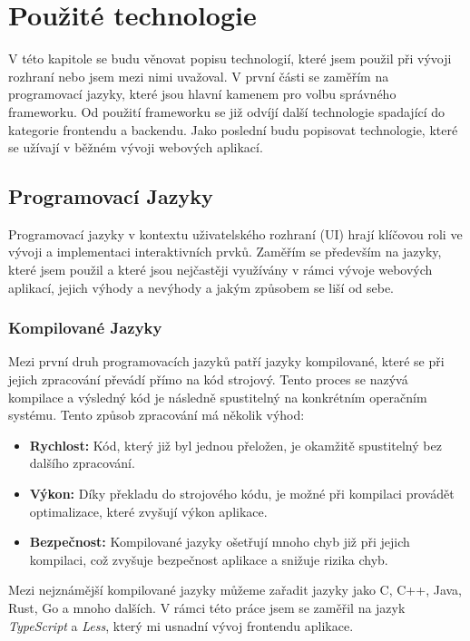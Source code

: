 \chapter{Použité technologie}
\label{ch:technology}
V této kapitole se budu věnovat popisu technologií, které jsem použil při vývoji rozhraní nebo jsem mezi nimi uvažoval. V první části se zaměřím na programovací jazyky, které jsou hlavní kamenem pro volbu správného frameworku. Od použití frameworku se již odvíjí další technologie spadající do kategorie frontendu a backendu. Jako poslední budu popisovat technologie, které se užívají v běžném vývoji webových aplikací.

\section{Programovací Jazyky}
\label{sec:languages}
Programovací jazyky v kontextu uživatelského rozhraní (UI) hrají klíčovou roli ve vývoji a implementaci interaktivních prvků. Zaměřím se především na jazyky, které jsem použil a které jsou nejčastěji využívány v rámci vývoje webových aplikací, jejich výhody a nevýhody a jakým způsobem se liší od sebe.

\subsection{Kompilované Jazyky}
\label{subsec:languages-compiled}
Mezi první druh programovacích jazyků patří jazyky kompilované, které se při jejich zpracování převádí přímo na kód strojový. Tento proces se nazývá kompilace a výsledný kód je následně spustitelný na konkrétním operačním systému. Tento způsob zpracování má několik výhod:

\begin{itemize}
    \item \textbf{Rychlost:} Kód, který již byl jednou přeložen, je okamžitě spustitelný bez dalšího zpracování.
    \item \textbf{Výkon:} Díky překladu do strojového kódu, je možné při kompilaci provádět optimalizace, které zvyšují výkon aplikace.
    \item \textbf{Bezpečnost:} Kompilované jazyky ošetřují mnoho chyb již při jejich kompilaci, což zvyšuje bezpečnost aplikace a snižuje rizika chyb.
\end{itemize}

Mezi nejznámější kompilované jazyky můžeme zařadit jazyky jako C, C++, Java, Rust, Go a mnoho dalších. V rámci této práce jsem se zaměřil na jazyk \textit{TypeScript} a \textit{Less}, který mi usnadní vývoj frontendu aplikace.

